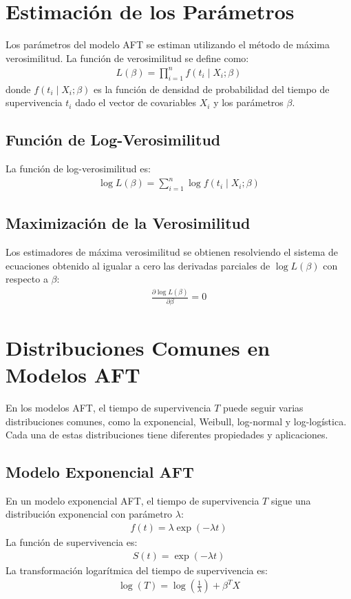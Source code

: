 \documentclass[a4paper]{report} %
\begin{document}
\section{Estimaci\'on de los Par\'ametros}
Los par\'ametros del modelo AFT se estiman utilizando el m\'etodo de m\'axima verosimilitud. La funci\'on de verosimilitud se define como:
\begin{eqnarray*}
L(\beta) = \prod_{i=1}^n f(t_i \mid X_i; \beta)
\end{eqnarray*}
donde $f(t_i \mid X_i; \beta)$ es la funci\'on de densidad de probabilidad del tiempo de supervivencia $t_i$ dado el vector de covariables $X_i$ y los par\'ametros $\beta$.

\subsection{Funci\'on de Log-Verosimilitud}
La funci\'on de log-verosimilitud es:
\begin{eqnarray*}
\log L(\beta) = \sum_{i=1}^n \log f(t_i \mid X_i; \beta)
\end{eqnarray*}

\subsection{Maximizaci\'on de la Verosimilitud}
Los estimadores de m\'axima verosimilitud se obtienen resolviendo el sistema de ecuaciones obtenido al igualar a cero las derivadas parciales de $\log L(\beta)$ con respecto a $\beta$:
\begin{eqnarray*}
\frac{\partial \log L(\beta)}{\partial \beta} = 0
\end{eqnarray*}

\section{Distribuciones Comunes en Modelos AFT}
En los modelos AFT, el tiempo de supervivencia $T$ puede seguir varias distribuciones comunes, como la exponencial, Weibull, log-normal y log-log\'istica. Cada una de estas distribuciones tiene diferentes propiedades y aplicaciones.

\subsection{Modelo Exponencial AFT}
En un modelo exponencial AFT, el tiempo de supervivencia $T$ sigue una distribuci\'on exponencial con par\'ametro $\lambda$:
\begin{eqnarray*}
f(t) = \lambda \exp(-\lambda t)
\end{eqnarray*}
La funci\'on de supervivencia es:
\begin{eqnarray*}
S(t) = \exp(-\lambda t)
\end{eqnarray*}
La transformaci\'on logar\'itmica del tiempo de supervivencia es:
\begin{eqnarray*}
\log(T) = \log\left(\frac{1}{\lambda}\right) + \beta^T X
\end{eqnarray*}
\end{document}
